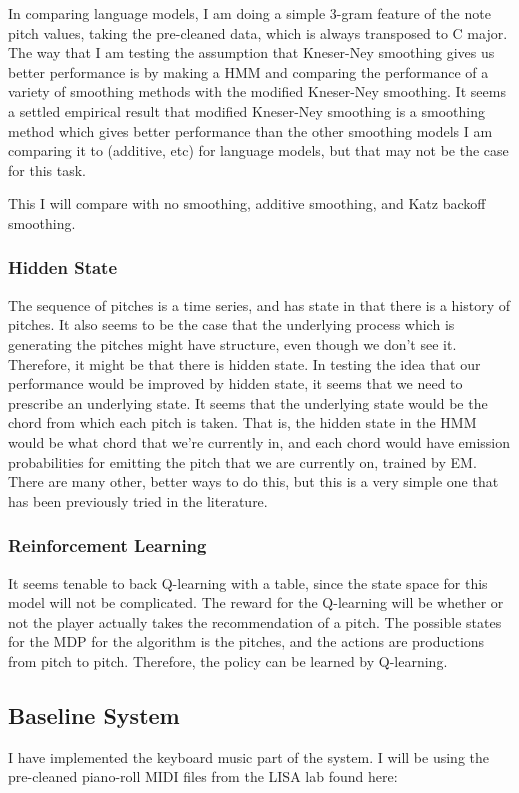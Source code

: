 \documentclass{article}
\begin{document}
In comparing language models, I am doing a simple 3-gram feature of the note pitch values, taking the pre-cleaned data, which is always transposed to C major. The way that I am testing the assumption that Kneser-Ney smoothing gives us better performance is by making a HMM and comparing the performance of a variety of smoothing methods with the modified Kneser-Ney smoothing. It seems a settled empirical result that modified Kneser-Ney smoothing is a smoothing method which gives better performance than the other smoothing models I am comparing it to (additive, etc) for language models\cite{Goodman}, but that may not be the case for this task.

This I will compare with no smoothing, additive smoothing, and Katz backoff smoothing\cite{Katz}.

\subsubsection*{Hidden State}
The sequence of pitches is a time series, and has state in that there is a history of pitches. It also seems to be the case that the underlying process which is generating the pitches might have structure, even though we don't see it. Therefore, it might be that there is hidden state. In testing the idea that our performance would be improved by hidden state, it seems that we need to prescribe an underlying state\cite{Rabiner}. It seems that the underlying state would be the chord from which each pitch is taken. That is, the hidden state in the HMM would be what chord that we're currently in, and each chord would have emission probabilities for emitting the pitch that we are currently on, trained by EM. There are many other, better ways to do this, but this is a very simple one that has been previously tried in the literature\cite{Schulze}.

\subsubsection*{Reinforcement Learning}

It seems tenable to back Q-learning with a table, since the state space for this model will not be complicated. The reward for the Q-learning will be whether or not the player actually takes the recommendation of a pitch. The possible states for the MDP for the algorithm is the pitches, and the actions are productions from pitch to pitch. Therefore, the policy can be learned by Q-learning.

\subsection*{Baseline System}
I have implemented the keyboard music part of the system. I will be using the pre-cleaned piano-roll MIDI files from the LISA lab found here:
\end{document}
